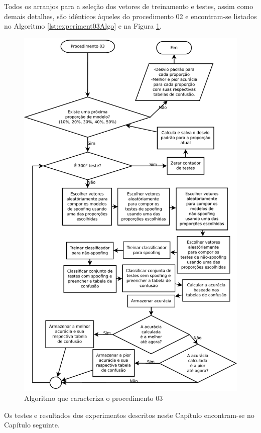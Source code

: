 		\par Todos os arranjos para a seleção dos vetores de treinamento e testes, assim como demais detalhes,   são idênticos àqueles do procedimento 02 e encontram-se listados no Algoritmo \ref{lst:experiment03Algo} e na Figura \ref{fig:experiment03Algo}. 
		
		
		
		\begin{figure}[h]
			\centering
			\includegraphics[width=0.9\linewidth]{images/AlgoProcedure03}
			\caption{Algoritmo que caracteriza o procedimento 03}
			\label{fig:experiment03Algo}
		\end{figure}

        \par Os testes e resultados dos experimentos descritos neste Capítulo encontram-se no Capítulo seguinte.
